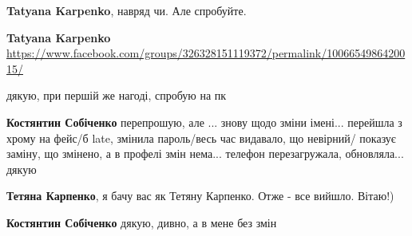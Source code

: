 \begin{itemize}
\begin{itemize}
\textbf{Tatyana Karpenko}, навряд чи. Але спробуйте.

 
\textbf{Tatyana Karpenko}
\url{https://www.facebook.com/groups/326328151119372/permalink/1006654986420015/}

 
дякую, при першій же нагоді, спробую на пк

 
\textbf{Костянтин Собіченко} перепрошую, але ... знову щодо зміни імені... перейшла з хрому на фейс/б late, змінила пароль/весь час видавало, що невірний/ показує заміну, що змінено, а в профелі змін нема... телефон перезагружала, обновляла... дякую

 
\textbf{Тетяна Карпенко}, я бачу вас як Тетяну Карпенко. Отже - все вийшло. Вітаю!)

 
\textbf{Костянтин Собіченко} дякую, дивно, а в мене без змін

 

\end{itemize}
\end{itemize}
